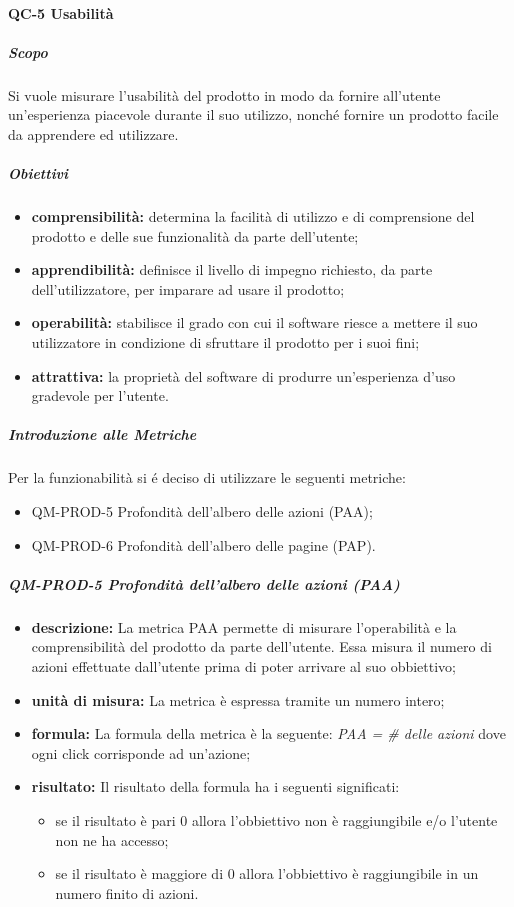 		\paragraph{QC-5 Usabilità}
			\subparagraph{Scopo}
			Si vuole misurare l'usabilità del prodotto in modo da fornire all'utente un'esperienza piacevole durante il suo utilizzo, nonché fornire un prodotto facile da apprendere ed utilizzare.
			\subparagraph{Obiettivi}
				\begin{itemize}
					\item \textbf{comprensibilità:} determina la facilità di utilizzo e di comprensione del prodotto e delle sue funzionalità da parte dell'utente;
					\item \textbf{apprendibilità:} definisce il livello di impegno richiesto, da parte dell'utilizzatore, per imparare ad usare il prodotto;
					\item \textbf{operabilità:} stabilisce il grado con cui il software riesce a mettere il suo utilizzatore in condizione di sfruttare il prodotto per i suoi fini;
					\item \textbf{attrattiva:} la proprietà del software di produrre un'esperienza d'uso gradevole per l'utente.
				\end{itemize}
			\subparagraph{Introduzione alle Metriche}
				Per la funzionabilità si é deciso di utilizzare le seguenti metriche:
				\begin{itemize}
					\item QM-PROD-5 Profondità dell'albero delle azioni (PAA);
					\item QM-PROD-6 Profondità dell'albero delle pagine (PAP).
				\end{itemize}
			\subparagraph{QM-PROD-5 Profondità dell'albero delle azioni (PAA)}
			\begin{itemize}
      			\item \textbf{descrizione: }
					La metrica PAA permette di misurare l'operabilità e la comprensibilità del prodotto da parte dell'utente. Essa misura il numero di azioni effettuate dall'utente prima di poter arrivare al suo obbiettivo;
				\item \textbf{unità di misura: }
					La metrica è espressa tramite un numero intero;
				\item \textbf{formula: }
					La formula della metrica è la seguente:
					\textit{PAA = \# delle azioni}
					dove ogni click corrisponde ad un'azione;
				\item \textbf{risultato: }
					Il risultato della formula ha i seguenti significati:
					\begin{itemize}
						\item se il risultato è pari 0 allora l'obbiettivo non è raggiungibile e/o l'utente non ne ha accesso;
						\item se il risultato è maggiore di 0 allora l'obbiettivo è raggiungibile in un numero finito di azioni.
					\end{itemize}
			\end{itemize}
